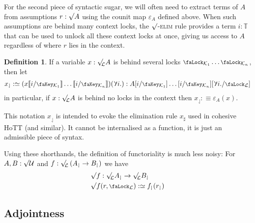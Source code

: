 \documentclass[10pt]{article}
\theoremstyle{definition}
\newtheorem{definition}[theorem]{Definition}
\let\oldequiv\equiv%
\renewcommand{\equiv}{\simeq}
\newcommand{\defeq}{\oldequiv}
\newcommand{\rulen}[1]{\textsc{#1}}
\newcommand*{\univ}{\mathcal{U}}
\newcommand{\lock}{\mathchoice {\scalebox{0.8}{\text{\faLock}}}
  {\scalebox{0.8}{\text{\faLock}}} {\scalebox{0.5}{\text{\faLock}}}
  {\scalebox{0.4}{\text{\faLock}}} }
\newcommand{\key}{\mathchoice
  {\scalebox{0.8}{\text{\faKey}}} {\scalebox{0.8}{\text{\faKey}}}
  {\scalebox{0.5}{\text{\faKey}}} {\scalebox{0.4}{\text{\faKey}}} }
\newcommand{\rbindsym}{\raisebox{-0.5pt}{\scalerel*{\reflectbox{\rotatebox[origin=c]{185}{$\lambda$}}}{\lambda}}}
\newcommand{\rbind}[1]{\rbindsym{} #1.}
\newcommand{\Tiny}{\mathbb{T}}
\newcommand{\lockn}[1]{\mathcal{#1}}
\newcommand{\ctxlocke}[1]{\lock_{#1}}
\newcommand{\ctxlock}[1]{\ctxlocke{\lockn{#1}}}
\newcommand{\stubra}[1]{\llbracket #1 \rrbracket}
\newcommand{\admbra}[1]{[ #1 ]}
\newcommand{\subkeye}[2]{\admbra{#1/\key_{#2}}}
\newcommand{\substucke}[2]{\stubra{#1/\key_{#2}}}
\newcommand{\sublock}[2]{\admbra{\rbindsym{} #2. /\lock_{\lockn{#1}} }}
\newcommand{\rformsym}{\surd}
\newcommand{\rforme}[2]{\ThisStyle{\raisebox{0.07em}{$\SavedStyle \rformsym_{\hspace{-0.25em}#1}$}} #2}
\newcommand{\rform}[2]{\rforme{\lockn{#1}}{#2}}
\newcommand{\rformu}[1]{\ThisStyle{\raisebox{0.07em}{$\SavedStyle \rformsym$}} #1}
\newcommand{\rget}[1]{{#1}_{\downharpoonleft}}
\begin{document}
For the second piece of syntactic sugar, we will often need to extract
terms of $A$ from assumptions $r : \rformu{A}$ using the counit map
$\varepsilon_A$ defined above. When such assumptions are behind many
context locks, the \rulen{$\rformsym$-elim} rule provides a term
$i : \Tiny$ that can be used to unlock all these context locks at
once, giving us access to $A$ regardless of where $r$ lies in the
context.
\begin{definition}
  If a variable $x : \rform{L} A$ is behind several locks
  $\ctxlocke{\lockn{K}_1} \dots \ctxlocke{\lockn{K}_n}$, then let
  \begin{align*}
    \rget{x} :\defeq (x \substucke{i}{\lockn{K}_1}
    \dots \substucke{i}{\lockn{K}_n})(\rbind{i}) : A \subkeye{i}{\lockn{K}_1}
    \dots \subkeye{i}{\lockn{K}_n}\sublock{L}{i}
  \end{align*}
  in particular, if $x : \rform{L} A$ is behind no locks in the
  context then $\rget{x} :\defeq \varepsilon_A(x)$.
\end{definition}
This notation $\rget{x}$ is intended to evoke the elimination rule
$x_\sharp$ used in cohesive HoTT (and similar). It cannot be
internalised as a function, it is just an admissible piece of syntax.

Using these shorthands, the definition of functoriality is much less
noisy: For $A,B : \rformu \univ$ and
$f : \rform{L}\left(\rget{A} \to \rget{B}\right)$ we have
\begin{align*}
  &\rformu f : \rform{L}\rget{A} \to \rform{L}\rget{B} \\
  &\rformu f(r, \ctxlock{L}) :\defeq \rget{f}(\rget{r})
\end{align*}

\subsection{Adjointness}\label{sec:adjointness}
\end{document}
